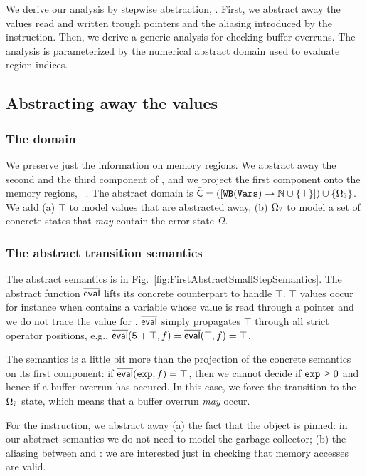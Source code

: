 \documentclass[10pt]{sigplanconf}
\begin{document}
We derive our analysis by stepwise abstraction, \cite{Cousot98}.
First, we abstract away the values read and written trough pointers and the aliasing introduced by the  instruction.
Then, we derive a generic analysis for checking buffer overruns.
The analysis is parameterized by the numerical abstract domain used to evaluate region indices.


\subsection{Abstracting away the values}

\subsubsection{The domain}
We preserve just the information on memory regions.
We abstract away the second and the third component of \Cdom , and we project the first component onto the memory regions, \ie\ \WB{\variables}. 
The abstract domain is $\bar{\mathsf{C}}=([\mathtt{WB}(\mathtt{\mathtt{Vars}}) \rightarrow\mathbb{N} \cup \{ \top \}]) \cup \{ \Omega_? \}$. 
We add (a) $\top$ to model values that are abstracted away, (b) $\Omega_?$ to model a set of concrete states that \emph{may} contain the error state $\Omega$.



\subsubsection{The abstract transition semantics}
The abstract semantics is in
Fig.~\ref{fig:FirstAbstractSmallStepSemantics}.  The abstract function
$\overline{\mathsf{eval}}$ lifts its concrete counterpart to handle $\top$. $\top$
values occur for instance when  contains a variable  whose value is read
through a pointer and we do not trace the value for . $\overline{\mathsf{eval}}$
simply propagates $\top$ through all strict operator positions, e.g.,
$\overline{\mathsf{eval}}(\mathtt{5 + \top},f) = \overline{\mathsf{eval}}(\mathtt{\top},f) = \top$.

The semantics is a little
bit more than the projection of the concrete semantics on its first
component: if $\overline{\mathsf{eval}}(\mathtt{exp},f) = \top$, then we cannot decide if
$\mathtt{exp} \geq 0$ and hence if a buffer overrun has occured.  In
this case, we force the transition to the $\Omega_?$ state, which
means that a buffer overrun \emph{may} occur.

For the  instruction, we abstract away (a) the fact that
the object is pinned: in our abstract semantics we do not need to model the garbage collector; (b) the aliasing between  and : we are interested just in checking that memory accesses are valid.
\end{document}

